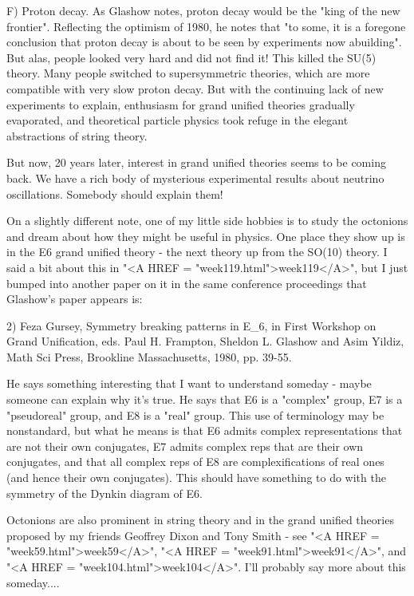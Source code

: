 F) Proton decay.  As Glashow notes, proton decay would be the "king
of the new frontier".  Reflecting the optimism of 1980, he notes
that "to some, it is a foregone conclusion that proton decay is
about to be seen by experiments now abuilding".  But alas, people
looked very hard and did not find it!  This killed the SU(5) theory.
Many people switched to supersymmetric theories, which are more
compatible with very slow proton decay.  But with the continuing lack of
new experiments to explain, enthusiasm for grand unified theories
gradually evaporated, and theoretical particle physics took refuge in
the elegant abstractions of string theory.

But now, 20 years later, interest in grand unified theories seems
to be coming back.  We have a rich body of mysterious experimental
results about neutrino oscillations.  Somebody should explain them!

On a slightly different note, one of my little side hobbies is to study
the octonions and dream about how they might be useful in physics.  One
place they show up is in the E6 grand unified theory - the next theory
up from the SO(10) theory.  I said a bit about this in "<A HREF =
"week119.html">week119</A>", but I just bumped into another paper
on it in the same conference proceedings that Glashow's paper appears
is:

2) Feza Gursey, Symmetry breaking patterns in E_6, in First Workshop on
Grand Unification, eds. Paul H. Frampton, Sheldon L. Glashow and Asim
Yildiz, Math Sci Press, Brookline Massachusetts, 1980, pp. 39-55.

He says something interesting that I want to understand someday - maybe
someone can explain why it's true.  He says that E6 is a "complex"
group, E7 is a "pseudoreal" group, and E8 is a
"real" group.  This use of terminology may be nonstandard, but
what he means is that E6 admits complex representations that are not
their own conjugates, E7 admits complex reps that are their own
conjugates, and that all complex reps of E8 are complexifications of
real ones (and hence their own conjugates).  This should have something
to do with the symmetry of the Dynkin diagram of E6.

Octonions are also prominent in string theory and in the grand unified
theories proposed by my friends Geoffrey Dixon and Tony Smith - see
"<A HREF = "week59.html">week59</A>", "<A HREF =
"week91.html">week91</A>", and "<A HREF =
"week104.html">week104</A>".  I'll probably say more about this
someday....

